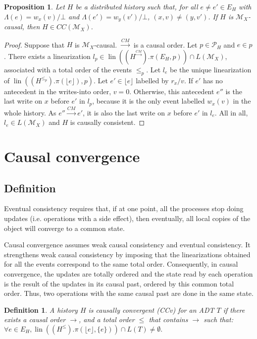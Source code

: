 \documentclass[9pt,numbers]{sigplanconf}
\newtheorem{proposition}{Proposition}
\newtheorem{definition}{Definition}
\DeclareMathOperator{\lin}{lin}
\begin{document}
\begin{proposition}
  Let $H$ be a distributed history such that, for all $e\neq e'\in E_H$ with $\Lambda(e) = w_x(v)/\bot$ and 
  $\Lambda(e') = w_y(v')/\bot$, $(x,v) \neq (y,v')$. If $H$ is $\mathcal{M}_X$-causal, then $H \in CC(\mathcal{M}_X)$.
\end{proposition}
\begin{proof}
  Suppose that $H$ is $\mathcal{M}_X$-causal. $\xrightarrow{CM}$ is a causal order.
  Let $p\in \mathscr{P}_H$ and $e\in p$. There exists a linearization 
  $l_p \in \lin((H^{\xrightarrow{CM}}).\pi(E_H, p)) \cap L(\mathcal{M}_X)$, associated with a total order of the events 
  $\le_p$. 
  Let $l_e$ be the unique linearization of $\lin((H^{\le_p}).\pi(\lfloor e\rfloor), p)$. 
  Let $e'\in \lfloor e\rfloor$ labelled by $r_x/v$. If $e'$ has no antecedent in the writes-into order, $v=0$. Otherwise, 
  this antecedent $e''$ is the last write on $x$ before $e'$ in $l_p$, because it is the only event 
  labelled $w_x(v)$ in the whole history. As $e'' \xrightarrow{CM} e'$, it is also the last write on $x$ before $e'$ in $l_e$.
  All in all, $l_e \in L(\mathcal{M}_X)$ and $H$ is causally consistent.
\end{proof}


\section{Causal convergence} \label{sec:ccv}


\subsection{Definition}

Eventual consistency \cite{vogels2008eventually} requires that, if at one point, 
all the processes stop doing updates (i.e. operations with a side effect), 
then eventually, all local copies of the object will converge to a common state.

Causal convergence assumes weak causal consistency and eventual consistency. It strengthens weak causal consistency by imposing that the linearizations obtained for all the events correspond to the same total order. Consequently, in causal convergence, the updates are totally ordered and the state read by each operation is the result of
the updates in its causal past, ordered by this common total order. Thus, two operations with the 
same causal past are done in the same state.

\begin{definition}\label{def:causal_convergence} 
  A history $H$ is \emph{causally convergent} (CCv) for an ADT $T$ if there exists a causal 
  order $\rightarrow$, and a total order $\le$ that contains $\rightarrow$ such that:\\
  $\forall e\in E_H, \lin((H^\le).\pi(\lfloor e\rfloor, \{e\}))\cap L(T) \neq \emptyset.$
\end{definition}
\end{document}
